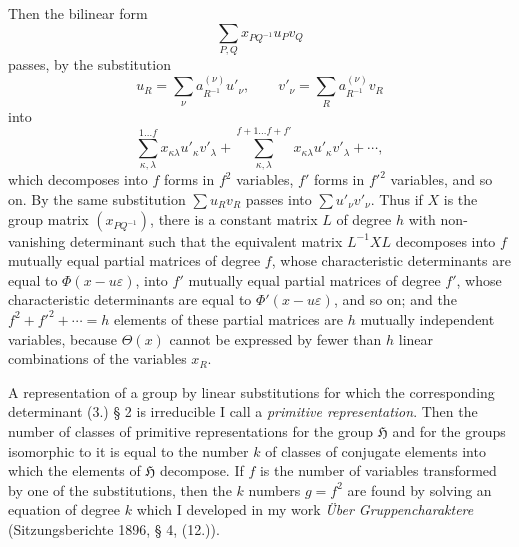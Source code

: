 \documentclass[11pt]{article}
\newcommand{\Hgrp}{\mathfrak{H}}
\newcommand{\eps}{\varepsilon}
\begin{document}
Then the bilinear form
\begin{equation}\tag{4.}
\sum_{P,Q}x_{PQ^{-1}}u_Pv_Q
\end{equation}
passes, by the substitution
\begin{equation}\tag{5.}
u_R=\sum_\nu a^{(\nu)}_{R^{-1}}u'_\nu,
\qquad
v'_\nu=\sum_R a^{(\nu)}_{R^{-1}}v_R
\end{equation}
into
\begin{equation}\tag{6.}
\sum_{\kappa,\lambda}^{1\ldots f}x_{\kappa\lambda}u'_\kappa v'_\lambda
+\sum_{\kappa,\lambda}^{f+1\ldots f+f'}x_{\kappa\lambda}u'_\kappa v'_\lambda+\cdots,
\end{equation}
which decomposes into $f$ forms in $f^2$ variables, $f'$ forms in ${f'}^2$ variables, and so on. By the same substitution $\sum u_Rv_R$ passes into $\sum u'_\nu v'_\nu$. Thus if $X$ is the group matrix $(x_{PQ^{-1}})$, there is a constant matrix $L$ of degree $h$ with non-vanishing determinant such that the equivalent matrix $L^{-1}XL$ decomposes into $f$ mutually equal partial matrices of degree $f$, whose characteristic determinants are equal to $\Phi(x-u\eps)$, into $f'$ mutually equal partial matrices of degree $f'$, whose characteristic determinants are equal to $\Phi'(x-u\eps)$, and so on; and the $f^2+{f'}^2+\cdots=h$ elements of these partial matrices are $h$ mutually independent variables, because $\Theta(x)$ cannot be expressed by fewer than $h$ linear combinations of the variables $x_R$.

A representation of a group by linear substitutions for which the corresponding determinant (3.) § 2 is irreducible I call a \emph{primitive representation}. Then the number of classes of primitive representations for the group $\Hgrp$ and for the groups isomorphic to it is equal to the number $k$ of classes of conjugate elements into which the elements of $\Hgrp$ decompose. If $f$ is the number of variables transformed by one of the substitutions, then the $k$ numbers $g=f^2$ are found by solving an equation of degree $k$ which I developed in my work \emph{Über Gruppencharaktere} (Sitzungsberichte 1896, § 4, (12.)).
\end{document}
